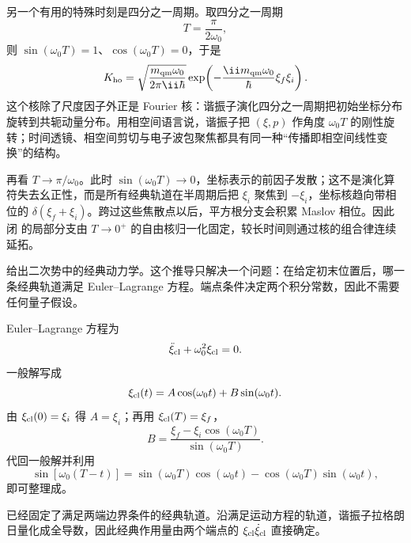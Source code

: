 \begin{exbox}[谐振子传播核]
另一个有用的特殊时刻是四分之一周期。取四分之一周期
\begin{equation*}
 T=\frac{\pi}{2\omega_0},
\end{equation*}
则 $\sin(\omega_0T)=1$、$\cos(\omega_0T)=0$，于是
\begin{equation*}
 K_{\rm ho}
 =\sqrt{\frac{m_{\rm qm}\omega_0}{2\pi\ii\hbar}}
 \exp\!\left(-\frac{\ii m_{\rm qm}\omega_0}{\hbar}\xi_f\xi_i\right).
\end{equation*}
这个核除了尺度因子外正是 Fourier 核：谐振子演化四分之一周期把初始坐标分布旋转到共轭动量分布。用相空间语言说，谐振子把 $(\xi,p)$ 作角度 $\omega_0T$ 的刚性旋转；时间透镜、相空间剪切与电子波包聚焦都具有同一种“传播即相空间线性变换”的结构。

再看 $T\to\pi/\omega_0$。此时 $\sin(\omega_0T)\to0$，坐标表示的前因子发散；这不是演化算符失去幺正性，而是所有经典轨道在半周期后把 $\xi_i$ 聚焦到 $-\xi_i$，坐标核趋向带相位的 $\delta(\xi_f+\xi_i)$。跨过这些焦散点以后，平方根分支会积累 Maslov 相位。因此闭 的局部分支由 $T\to0^+$ 的自由核归一化固定，较长时间则通过核的组合律连续延拓。


\medskip

 给出二次势中的经典动力学。这个推导只解决一个问题：在给定初末位置后，哪一条经典轨道满足 Euler--Lagrange 方程。端点条件决定两个积分常数，因此不需要任何量子假设。

Euler--Lagrange 方程为
\begin{equation*}
 \ddot\xi_{\rm cl}+\omega_0^2\xi_{\rm cl}=0.
\end{equation*}
一般解写成
\begin{equation*}
 \xi_{\rm cl}(t)=A\cos(\omega_0t)+B\sin(\omega_0t).
\end{equation*}
由 $\xi_{\rm cl}(0)=\xi_i$ 得 $A=\xi_i$；再用 $\xi_{\rm cl}(T)=\xi_f$，
\begin{equation*}
 B=\frac{\xi_f-\xi_i\cos(\omega_0T)}{\sin(\omega_0T)}.
\end{equation*}
代回一般解并利用
\begin{equation*}
 \sin[\omega_0(T-t)]
 =\sin(\omega_0T)\cos(\omega_0t)
 -\cos(\omega_0T)\sin(\omega_0t),
\end{equation*}
即可整理成。


\medskip

 已经固定了满足两端边界条件的经典轨道。沿满足运动方程的轨道，谐振子拉格朗日量化成全导数，因此经典作用量由两个端点的 $\xi_{\rm cl}\dot\xi_{\rm cl}$ 直接确定。


\end{exbox}
